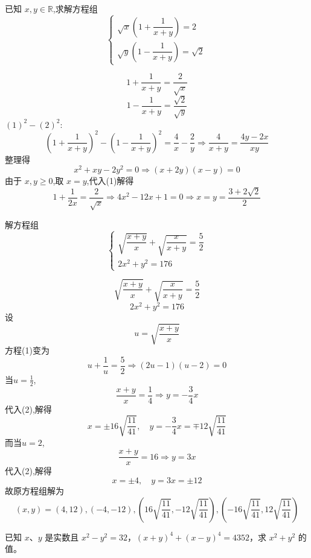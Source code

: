 \begin{questions}
    \question 已知 $x, y \in \mathbb{R}$,求解方程组
    \[
    \begin{cases} 
    \sqrt{x}\left(1+\dfrac{1}{x+y}\right)=2 \\[8pt]
    \sqrt{y}\left(1-\dfrac{1}{x+y}\right)=\sqrt{2} 
    \end{cases}
    \]
    \begin{solution}
        \[
        1+\frac{1}{x+y} = \frac{2}{\sqrt{x}} \tag{1} 
        \]
        \[
        1-\frac{1}{x+y} = \frac{\sqrt{2}}{\sqrt{y}} \tag{2} 
        \]
        $(1)^2-(2)^2$:
        \[
        \left(1+\frac{1}{x+y}\right)^2 - \left(1-\frac{1}{x+y}\right)^2 = \frac{4}{x} - \frac{2}{y} \Rightarrow \frac{4}{x+y} = \frac{4y-2x}{xy}
        \]
        整理得
        \[
        x^2 + xy - 2y^2 = 0 \Rightarrow (x+2y)(x-y)=0
        \]
        由于 $x,y \ge 0$,取 $x=y$,代入(1)解得
        \[
        1 + \frac{1}{2x} = \frac{2}{\sqrt{x}} \Rightarrow 4x^2 - 12x +1 =0 \Rightarrow x = y = \frac{3+2\sqrt{2}}{2}
        \]
    \end{solution}

    \question 解方程组
    \[
    \begin{cases} 
    \sqrt{\dfrac{x+y}{x}}+\sqrt{\dfrac{x}{x+y}}=\dfrac{5}{2} \\[8pt]
    2x^{2}+y^{2}=176
    \end{cases}
    \]
    \begin{solution}
        \[
        \sqrt{\frac{x+y}{x}}+\sqrt{\frac{x}{x+y}}=\frac{5}{2} \tag{1}
        \]
        \[
        2x^{2}+y^{2}=176 \tag{2}
        \]
        设
        \[
        u = \sqrt{\frac{x+y}{x}}
        \]
        方程(1)变为
        \[
        u + \frac{1}{u} = \frac{5}{2} \Rightarrow (2u-1)(u-2)=0
        \]
        当$u=\frac{1}{2}$,
        \[
        \frac{x+y}{x} = \frac{1}{4} \Rightarrow y = -\frac{3}{4}x
        \]
        代入(2),解得
        \[
        x = \pm 16 \sqrt{\frac{11}{41}}, \quad y = -\frac{3}{4}x = \mp 12 \sqrt{\frac{11}{41}}
        \]
        而当$u=2$,
        \[
        \frac{x+y}{x} = 16 \Rightarrow y = 3x
        \]
        代入(2),解得
        \[
        x = \pm 4, \quad y = 3x = \pm 12
        \]
        故原方程组解为
        \[
        (x,y) = (4,12), (-4,-12), \left(16\sqrt{\frac{11}{41}}, -12\sqrt{\frac{11}{41}}\right), \left(-16\sqrt{\frac{11}{41}}, 12\sqrt{\frac{11}{41}}\right)
        \]
    \end{solution}

    \question
已知 $x$、$y$ 是实数且 $x^2 - y^2 = 32$，$(x+y)^4 + (x-y)^4 = 4352$，求 $x^2 + y^2$ 的值。


\end{questions}
